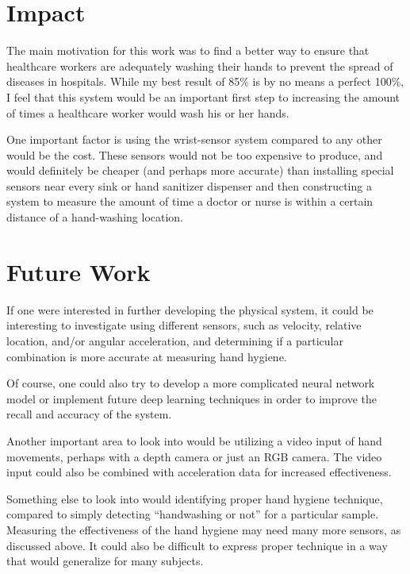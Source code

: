 \documentclass[]{report}
\begin{document}
\section{Impact}

The main motivation for this work was to find a better way to ensure that healthcare workers are adequately washing their hands to prevent the spread of diseases in hospitals. While my best result of 85\% is by no means a perfect 100\%, I feel that this system would be an important first step to increasing the amount of times a healthcare worker would wash his or her hands.

One important factor is using the wrist-sensor system compared to any other would be the cost. These sensors would not be too expensive to produce, and would definitely be cheaper (and perhaps more accurate) than installing special sensors near every sink or hand sanitizer dispenser and then constructing a system to measure the amount of time a doctor or nurse is within a certain distance of a hand-washing location.

\section{Future Work}

If one were interested in further developing the physical system, it could be interesting to investigate using different sensors, such as velocity, relative location, and/or angular acceleration, and determining if a particular combination is more accurate at measuring hand hygiene.

Of course, one could also try to develop a more complicated neural network model or implement future deep learning techniques in order to improve the recall and accuracy of the system.

Another important area to look into would be utilizing a video input of hand movements, perhaps with a depth camera or just an RGB camera. The video input could also be combined with acceleration data for increased effectiveness.

Something else to look into would identifying proper hand hygiene technique, compared to simply detecting ``handwashing or not'' for a particular sample. Measuring the effectiveness of the hand hygiene may need many more sensors, as discussed above. It could also be difficult to express proper technique in a way that would generalize for many subjects.










\end{document}
